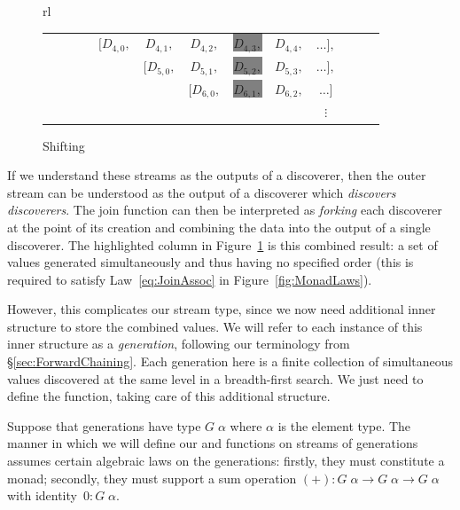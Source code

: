 \begin{figure}
\begin{tabular}{rl}
\begin{tabular}{ccccccccccccc}
      &&&& $[D_{4,0},$ & $D_{4,1},$ & $D_{4,2},$ & \colorbox{gray}{$D_{4,3},$} & $D_{4,4},$ & $\ldots],$\\
      &&&&& $[D_{5,0},$ & $D_{5,1},$ & \colorbox{gray}{$D_{5,2},$} & $D_{5,3},$ & $\ldots],$\\
      &&&&&& $[D_{6,0},$ & \colorbox{gray}{$D_{6,1},$} & $D_{6,2},$ & $\ldots]$\\
      &&&&&&&         &        & $\vdots$ &           &        &           
    \end{tabular}
  \end{tabular}
  \label{fig:ShiftGen}
  \caption{Shifting}
\end{figure}

If we understand these streams as the outputs of a discoverer, then the outer stream can be understood as the output of a discoverer which \emph{discovers discoverers}. The join function can then be interpreted as \emph{forking} each discoverer at the point of its creation and combining the data into the output of a single discoverer. The highlighted column in Figure~\ref{fig:ShiftGen} is this combined result: a set of values generated simultaneously and thus having no specified order (this is required to satisfy Law~\ref{eq:JoinAssoc} in Figure~\ref{fig:MonadLaws}).

However, this complicates our stream type, since we now need additional inner structure to store the combined values. We will refer to each instance of this inner structure as a \emph{generation}, following our terminology from \S\ref{sec:ForwardChaining}. Each generation here is a finite collection of simultaneous values discovered at the same level in a breadth-first search. We just need to define the  function, taking care of this additional structure.

Suppose that generations have type $G\;\alpha$ where $\alpha$ is the element type. The manner in which we will define our  and  functions on streams of generations assumes certain algebraic laws on the generations: firstly, they must constitute a monad; secondly, they must support a sum operation \mbox{$(+):G\;\alpha\rightarrow G\;\alpha\rightarrow G\;\alpha$} with identity~$0:G\;\alpha$. 

